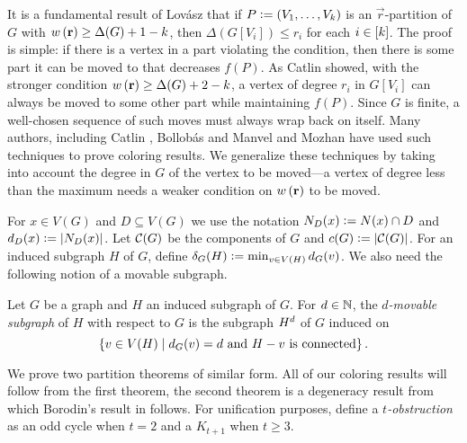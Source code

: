 It is a fundamental result of Lov\'asz \cite{lovasz1966decomposition} that if $P \mathrel{\mathop:}= \left( V_1, \ldots, V_k \right)$ is an $\vec{r}$-partition of $G$ with $w\left( \mathbf{r} \right) \geq \Delta(G) + 1 - k$, then $\Delta(G[V_i]) \leq r_i$ for each $i \in \left[k\right]$.  The proof is simple: if there is a vertex in a part violating the condition, then there is some part it can be moved to that decreases $f(P)$.  As Catlin \cite{CatlinAnotherBound} showed, with the stronger condition $w\left( \mathbf{r} \right) \geq \Delta(G) + 2 - k$, a vertex of degree $r_i$ in $G[V_i]$ can always be moved to some other part while maintaining $f(P)$.  Since $G$ is finite, a well-chosen sequence of such moves must always wrap back on itself.  Many authors, including Catlin \cite{CatlinAnotherBound}, Bollob\'as and Manvel \cite{bollobasManvel} and Mozhan \cite{mozhan1983} have used such techniques to prove coloring results. We generalize these techniques by taking into account the degree in $G$ of the vertex to be moved---a vertex of degree less than the maximum needs a weaker condition on $w\left( \mathbf{r} \right)$ to be moved.

For $x \in V(G)$ and $D \subseteq V(G)$ we use the notation $N_D(x) \mathrel{\mathop:}= N(x) \cap D$ and $d_D(x) \mathrel{\mathop:}= \left|N_D(x)\right|$. Let $\mathcal{C}(G)$ be the components of $G$ and $c(G) \mathrel{\mathop:}= \left|\mathcal{C}(G)\right|$. For an induced subgraph $H$ of $G$, define $\delta_G(H) \mathrel{\mathop:}= \min_{v \in V(H)} d_G(v)$.  We also need the following notion of a movable subgraph.
		
		\begin{defn}
			Let $G$ be a graph and $H$ an induced subgraph of $G$.  For $d \in \mathbb{N}$, the
			\emph{$d$-movable subgraph} of $H$ with respect to $G$ is the subgraph
			$H^{d}$ of $G$ induced on \[\left\{ v \in V(H) \mid d_G(v) = d \text{ and } H-v
			\text{ is connected} \right\}.\]
		\end{defn}

We prove two partition theorems of similar form.  
All of our coloring results will follow from the first theorem, the second theorem is a 
degeneracy result from which Borodin's result in \cite{borodin1976decomposition} follows.  
For unification purposes, define a \emph{$t$-obstruction} as an odd cycle when
$t=2$ and a $K_{t + 1}$ when $t \geq 3$.


